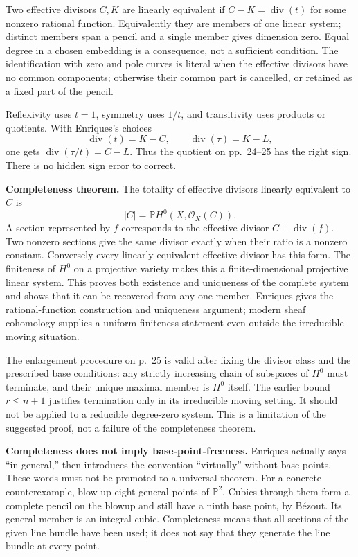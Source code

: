 Two effective divisors \(C,K\) are linearly equivalent if \(C-K=\operatorname{div}(t)\) for some nonzero rational function. Equivalently they are members of one linear system; distinct members span a pencil and a single member gives dimension zero. Equal degree in a chosen embedding is a consequence, not a sufficient condition. The identification with zero and pole curves is literal when the effective divisors have no common components; otherwise their common part is cancelled, or retained as a fixed part of the pencil.

Reflexivity uses \(t=1\), symmetry uses \(1/t\), and transitivity uses products or quotients. With Enriques's choices \[
\operatorname{div}(t)=K-C,\qquad
\operatorname{div}(\tau)=K-L,
\] one gets \(\operatorname{div}(\tau/t)=C-L\). Thus the quotient on pp.~24--25 has the right sign. There is no hidden sign error to correct.

\textbf{Completeness theorem.} The totality of effective divisors linearly equivalent to \(C\) is \[
|C|=\mathbb P H^0(X,\mathcal O_X(C)).
\] A section represented by \(f\) corresponds to the effective divisor \(C+\operatorname{div}(f)\). Two nonzero sections give the same divisor exactly when their ratio is a nonzero constant. Conversely every linearly equivalent effective divisor has this form. The finiteness of \(H^0\) on a projective variety makes this a finite-dimensional projective linear system. This proves both existence and uniqueness of the complete system and shows that it can be recovered from any one member. Enriques gives the rational-function construction and uniqueness argument; modern sheaf cohomology supplies a uniform finiteness statement even outside the irreducible moving situation.

The enlargement procedure on p.~25 is valid after fixing the divisor class and the prescribed base conditions: any strictly increasing chain of subspaces of \(H^0\) must terminate, and their unique maximal member is \(H^0\) itself. The earlier bound \(r\le n+1\) justifies termination only in its irreducible moving setting. It should not be applied to a reducible degree-zero system. This is a limitation of the suggested proof, not a failure of the completeness theorem.

\textbf{Completeness does not imply base-point-freeness.} Enriques actually says ``in general,'' then introduces the convention ``virtually'' without base points. These words must not be promoted to a universal theorem. For a concrete counterexample, blow up eight general points of \(\mathbb P^2\). Cubics through them form a complete pencil on the blowup and still have a ninth base point, by Bézout. Its general member is an integral cubic. Completeness means that all sections of the given line bundle have been used; it does not say that they generate the line bundle at every point.

